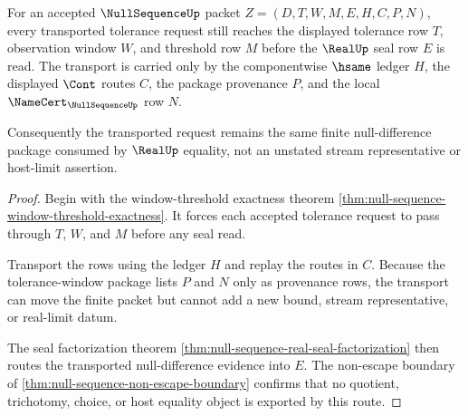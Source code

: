 \begin{theorem}
\label{thm:null-sequence-tolerance-window-transport}
For an accepted $\NullSequenceUp$ packet $Z=(D,T,W,M,E,H,C,P,N)$, every transported tolerance request still reaches the displayed tolerance row $T$, observation window $W$, and threshold row $M$ before the $\RealUp$ seal row $E$ is read. The transport is carried only by the componentwise $\hsame$ ledger $H$, the displayed $\Cont$ routes $C$, the package provenance $P$, and the local $\NameCert_{\NullSequenceUp}$ row $N$.

Consequently the transported request remains the same finite null-difference package consumed by $\RealUp$ equality, not an unstated stream representative or host-limit assertion.
\end{theorem}
\begin{proof}
Begin with the window-threshold exactness theorem \autoref{thm:null-sequence-window-threshold-exactness}. It forces each accepted tolerance request to pass through $T$, $W$, and $M$ before any seal read.

Transport the rows using the ledger $H$ and replay the routes in $C$. Because the tolerance-window package lists $P$ and $N$ only as provenance rows, the transport can move the finite packet but cannot add a new bound, stream representative, or real-limit datum.

The seal factorization theorem \autoref{thm:null-sequence-real-seal-factorization} then routes the transported null-difference evidence into $E$. The non-escape boundary of \autoref{thm:null-sequence-non-escape-boundary} confirms that no quotient, trichotomy, choice, or host equality object is exported by this route.
\end{proof}

